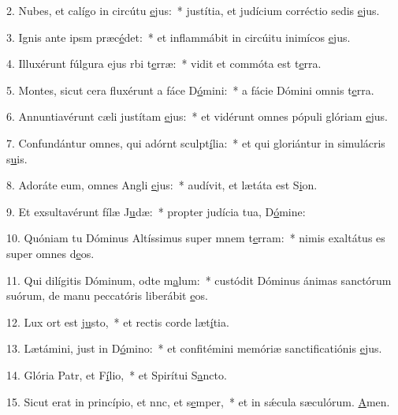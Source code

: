 2. Nubes, et calígo in circútu \uline{e}jus:~* justítia, et judícium corréctio sedis \uline{e}jus.\par 
3. Ignis ante ipsm præc\uline{é}det:~* et inflammábit in circúitu inimícos \uline{e}jus.\par 
4. Illuxérunt fúlgura ejus rbi t\uline{e}rræ:~* vidit et commóta est t\uline{e}rra.\par 
5. Montes, sicut cera fluxérunt a fáce D\uline{ó}mini:~* a fácie Dómini omnis t\uline{e}rra.\par 
6. Annuntiavérunt cæli justítam \uline{e}jus:~* et vidérunt omnes pópuli glóriam \uline{e}jus.\par 
7. Confundántur omnes, qui adórnt sculpt\uline{í}lia:~* et qui gloriántur in simulácris s\uline{u}is.\par 
8. Adoráte eum, omnes Angli \uline{e}jus:~* audívit, et lætáta est S\uline{i}on.\par 
9. Et exsultavérunt fílæ J\uline{u}dæ:~* propter judícia tua, D\uline{ó}mine:\par 
10. Quóniam tu Dóminus Altíssimus super mnem t\uline{e}rram:~* nimis exaltátus es super omnes d\uline{e}os.\par 
11. Qui dilígitis Dóminum, odte m\uline{a}lum:~* custódit Dóminus ánimas sanctórum suórum, de manu peccatóris liberábit \uline{e}os.\par 
12. Lux ort est j\uline{u}sto,~* et rectis corde læt\uline{í}tia.\par 
13. Lætámini, just in D\uline{ó}mino:~* et confitémini memóriæ sanctificatiónis \uline{e}jus.\par 
14. Glória Patr, et F\uline{í}lio,~* et Spirítui S\uline{a}ncto.\par 
15. Sicut erat in princípio, et nnc, et s\uline{e}mper,~* et in sǽcula sæculórum. \uline{A}men.\par 
